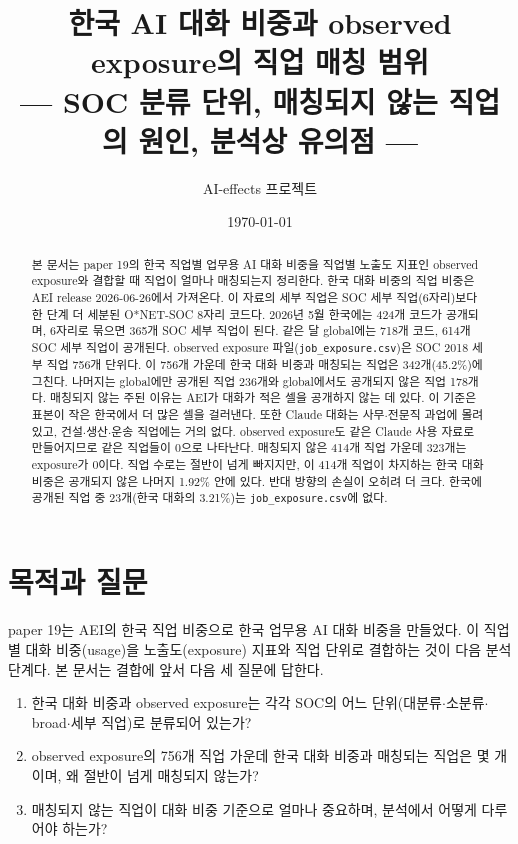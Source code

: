 \documentclass[11pt]{article}
\title{한국 AI 대화 비중과 observed exposure의 직업 매칭 범위\\[2mm]
\large --- SOC 분류 단위, 매칭되지 않는 직업의 원인, 분석상 유의점 ---}
\author{AI-effects 프로젝트}
\date{\today}
\begin{document}
\maketitle

\begin{abstract}
\noindent 본 문서는 paper 19의 한국 직업별 업무용 AI 대화 비중을 직업별 노출도 지표인 observed exposure\parencite{massenkoff-2026-labor-market-impacts-of-ai}와 결합할 때 직업이 얼마나 매칭되는지 정리한다. 한국 대화 비중의 직업 비중은 AEI release 2026-06-26\parencite{massenkoff-2026-cadences}에서 가져온다. 이 자료의 세부 직업은 SOC 세부 직업(6자리)보다 한 단계 더 세분된 O*NET-SOC 8자리 코드다. 2026년 5월 한국에는 424개 코드가 공개되며, 6자리로 묶으면 365개 SOC 세부 직업이 된다. 같은 달 global에는 718개 코드, 614개 SOC 세부 직업이 공개된다. observed exposure 파일(\texttt{job\_exposure.csv})은 SOC 2018 세부 직업 756개 단위다. 이 756개 가운데 한국 대화 비중과 매칭되는 직업은 342개(45.2\%)에 그친다. 나머지는 global에만 공개된 직업 236개와 global에서도 공개되지 않은 직업 178개다. 매칭되지 않는 주된 이유는 AEI가 대화가 적은 셀을 공개하지 않는 데 있다. 이 기준은 표본이 작은 한국에서 더 많은 셀을 걸러낸다. 또한 Claude 대화는 사무$\cdot$전문직 과업에 몰려 있고, 건설$\cdot$생산$\cdot$운송 직업에는 거의 없다. observed exposure도 같은 Claude 사용 자료로 만들어지므로 같은 직업들이 0으로 나타난다. 매칭되지 않은 414개 직업 가운데 323개는 exposure가 0이다. 직업 수로는 절반이 넘게 빠지지만, 이 414개 직업이 차지하는 한국 대화 비중은 공개되지 않은 나머지 1.92\% 안에 있다. 반대 방향의 손실이 오히려 더 크다. 한국에 공개된 직업 중 23개(한국 대화의 3.21\%)는 \texttt{job\_exposure.csv}에 없다.
\end{abstract}

\tableofcontents

\section{목적과 질문}

paper 19는 AEI의 한국 직업 비중으로 한국 업무용 AI 대화 비중을 만들었다. 이 직업별 대화 비중(usage)을 노출도(exposure) 지표와 직업 단위로 결합하는 것이 다음 분석 단계다. 본 문서는 결합에 앞서 다음 세 질문에 답한다.
\begin{enumerate}[leftmargin=*]
  \item 한국 대화 비중과 observed exposure는 각각 SOC의 어느 단위(대분류$\cdot$소분류$\cdot$broad$\cdot$세부 직업)로 분류되어 있는가?
  \item observed exposure의 756개 직업 가운데 한국 대화 비중과 매칭되는 직업은 몇 개이며, 왜 절반이 넘게 매칭되지 않는가?
  \item 매칭되지 않는 직업이 대화 비중 기준으로 얼마나 중요하며, 분석에서 어떻게 다루어야 하는가?
\end{enumerate}
\end{document}
